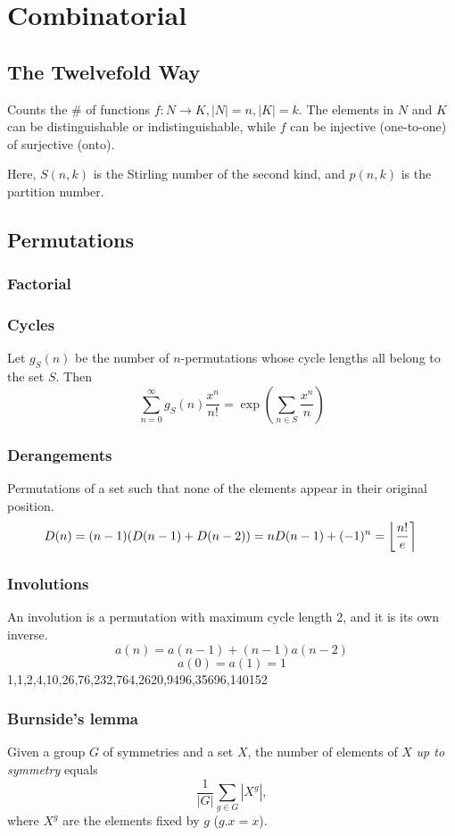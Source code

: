 \chapter{Combinatorial}

\section{The Twelvefold Way}
	Counts the \# of functions $f: N\to K, |N|=n, |K|=k$. The elements in $N$ and $K$ can be distinguishable or indistinguishable,
	while $f$ can be injective (one-to-one) of surjective (onto).
	
	Here, $S(n,k)$ is the Stirling number of the second kind, and $p(n,k)$ is the partition number.

\section{Permutations}
	\subsection{Factorial}
		

	\subsection{Cycles}
		Let $g_S(n)$ be the number of $n$-permutations whose cycle lengths all belong to the set $S$. Then
		$$\sum_{n=0} ^\infty g_S(n) \frac{x^n}{n!} = \exp\left(\sum_{n\in S} \frac{x^n} {n} \right)$$

	\subsection{Derangements}
		Permutations of a set such that none of the elements appear in their original position.
		\[ \mkern-2mu D(n) = (n-1)(D(n-1)+D(n-2)) = n D(n-1)+(-1)^n = \left\lfloor\frac{n!}{e}\right\rceil \]

	\subsection{Involutions}
		An involution is a permutation with maximum cycle length 2, and it is its own inverse.
		\[ a(n)=a(n-1)+(n-1)a(n-2) \]
		\[ a(0)=a(1)=1 \]
		1,1,2,4,10,26,76,232,764,2620,9496,35696,140152

	\subsection{Burnside's lemma}
		Given a group $G$ of symmetries and a set $X$, the number of elements of $X$ \emph{up to symmetry} equals
		 \[ {\frac {1}{|G|}}\sum _{{g\in G}}|X^{g}|, \]
		 where $X^{g}$ are the elements fixed by $g$ ($g.x = x$).


